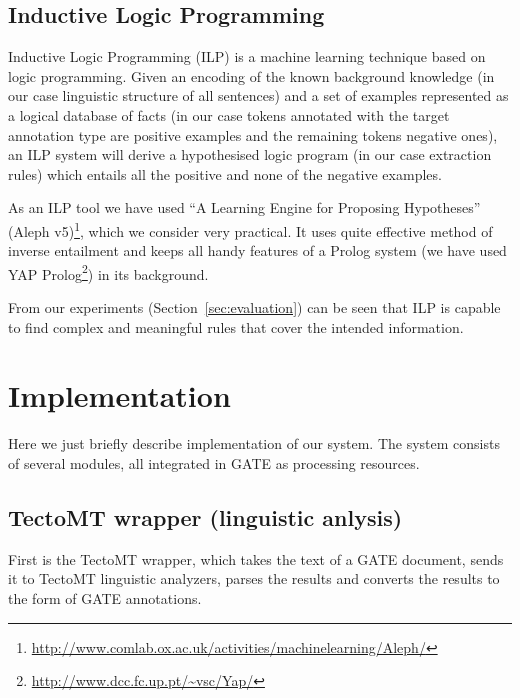 \documentclass[runningheads,a4paper]{llncs}
\begin{document}



\subsection{Inductive Logic Programming}
Inductive Logic Programming (ILP) \cite{dedek:MuggletonILP} is a machine learning technique based on logic programming. Given an encoding of the known background knowledge (in our case linguistic structure of all sentences) and a set of examples represented as a logical database of facts (in our case tokens annotated with the target annotation type are positive examples and the remaining tokens negative ones), an ILP system will derive a hypothesised logic program (in our case extraction rules) which entails all the positive and none of the negative examples.

As an ILP tool we have used ``A Learning Engine for Proposing Hypotheses'' (Aleph v5)\footnote{\url{http://www.comlab.ox.ac.uk/activities/machinelearning/Aleph/}}, which we consider very practical. It uses quite effective method of inverse entailment \cite{biblio:InverseEntailment} and keeps all handy features of a Prolog system (we have used YAP Prolog\footnote{\url{http://www.dcc.fc.up.pt/~vsc/Yap/}}) in its background.


From our experiments (Section~\ref{sec:evaluation}) can be seen that ILP is capable to find complex and meaningful rules that cover the intended information.

%





\section{Implementation}
Here we just briefly describe implementation of our system. The system consists of several modules, all integrated in GATE as processing resources.

\subsection{TectoMT wrapper (linguistic anlysis)}
First is the TectoMT wrapper, which takes the text of a GATE document, sends it to TectoMT linguistic analyzers, parses the results and converts the results to the form of GATE annotations.
\end{document}
